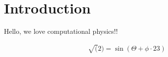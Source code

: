 \chapter{Introduction}

Hello, we love computational physics!!

\begin{align*}
	\sqrt(2) = \sin(\Theta +\phi \cdot 23 )
\end{align*}